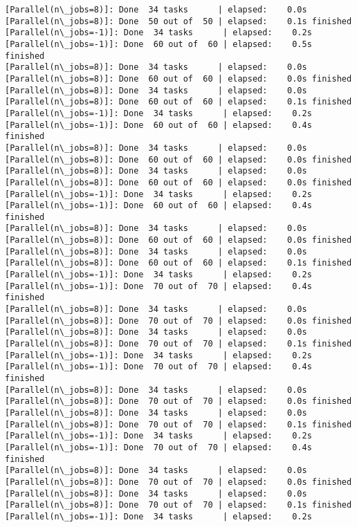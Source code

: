 \documentclass[11pt]{article}
\begin{document}
\begin{Verbatim}[commandchars=\\\{\}]
[Parallel(n\_jobs=8)]: Done  34 tasks      | elapsed:    0.0s
[Parallel(n\_jobs=8)]: Done  50 out of  50 | elapsed:    0.1s finished
[Parallel(n\_jobs=-1)]: Done  34 tasks      | elapsed:    0.2s
[Parallel(n\_jobs=-1)]: Done  60 out of  60 | elapsed:    0.5s finished
[Parallel(n\_jobs=8)]: Done  34 tasks      | elapsed:    0.0s
[Parallel(n\_jobs=8)]: Done  60 out of  60 | elapsed:    0.0s finished
[Parallel(n\_jobs=8)]: Done  34 tasks      | elapsed:    0.0s
[Parallel(n\_jobs=8)]: Done  60 out of  60 | elapsed:    0.1s finished
[Parallel(n\_jobs=-1)]: Done  34 tasks      | elapsed:    0.2s
[Parallel(n\_jobs=-1)]: Done  60 out of  60 | elapsed:    0.4s finished
[Parallel(n\_jobs=8)]: Done  34 tasks      | elapsed:    0.0s
[Parallel(n\_jobs=8)]: Done  60 out of  60 | elapsed:    0.0s finished
[Parallel(n\_jobs=8)]: Done  34 tasks      | elapsed:    0.0s
[Parallel(n\_jobs=8)]: Done  60 out of  60 | elapsed:    0.0s finished
[Parallel(n\_jobs=-1)]: Done  34 tasks      | elapsed:    0.2s
[Parallel(n\_jobs=-1)]: Done  60 out of  60 | elapsed:    0.4s finished
[Parallel(n\_jobs=8)]: Done  34 tasks      | elapsed:    0.0s
[Parallel(n\_jobs=8)]: Done  60 out of  60 | elapsed:    0.0s finished
[Parallel(n\_jobs=8)]: Done  34 tasks      | elapsed:    0.0s
[Parallel(n\_jobs=8)]: Done  60 out of  60 | elapsed:    0.1s finished
[Parallel(n\_jobs=-1)]: Done  34 tasks      | elapsed:    0.2s
[Parallel(n\_jobs=-1)]: Done  70 out of  70 | elapsed:    0.4s finished
[Parallel(n\_jobs=8)]: Done  34 tasks      | elapsed:    0.0s
[Parallel(n\_jobs=8)]: Done  70 out of  70 | elapsed:    0.0s finished
[Parallel(n\_jobs=8)]: Done  34 tasks      | elapsed:    0.0s
[Parallel(n\_jobs=8)]: Done  70 out of  70 | elapsed:    0.1s finished
[Parallel(n\_jobs=-1)]: Done  34 tasks      | elapsed:    0.2s
[Parallel(n\_jobs=-1)]: Done  70 out of  70 | elapsed:    0.4s finished
[Parallel(n\_jobs=8)]: Done  34 tasks      | elapsed:    0.0s
[Parallel(n\_jobs=8)]: Done  70 out of  70 | elapsed:    0.0s finished
[Parallel(n\_jobs=8)]: Done  34 tasks      | elapsed:    0.0s
[Parallel(n\_jobs=8)]: Done  70 out of  70 | elapsed:    0.1s finished
[Parallel(n\_jobs=-1)]: Done  34 tasks      | elapsed:    0.2s
[Parallel(n\_jobs=-1)]: Done  70 out of  70 | elapsed:    0.4s finished
[Parallel(n\_jobs=8)]: Done  34 tasks      | elapsed:    0.0s
[Parallel(n\_jobs=8)]: Done  70 out of  70 | elapsed:    0.0s finished
[Parallel(n\_jobs=8)]: Done  34 tasks      | elapsed:    0.0s
[Parallel(n\_jobs=8)]: Done  70 out of  70 | elapsed:    0.1s finished
[Parallel(n\_jobs=-1)]: Done  34 tasks      | elapsed:    0.2s

\end{Verbatim}
\end{document}
